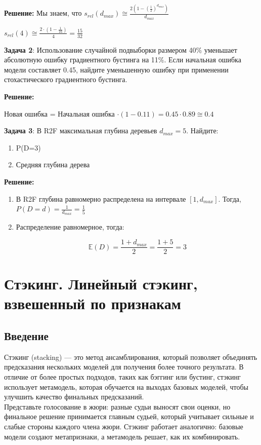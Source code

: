 \textbf{Решение:}
Мы знаем, что $s_{rel}(d_{max})\cong\frac{2 \left(1-\left(\frac{1}{2}\right)^{d_{max}}\right)}{d_{max}}$

$s_{rel}(4) \cong \frac{2 \cdot (1 - \frac{1}{16})}{4} = \frac{15}{32}$

\textbf{Задача 2}:
Использование случайной подвыборки размером 40\% уменьшает абсолютную ошибку градиентного бустинга на 11\%. Если начальная ошибка модели составляет 0.45, найдите уменьшенную ошибку при применении стохастического градиентного бустинга.

\textbf{Решение:}
\begin{center}
    Новая ошибка = Начальная ошибка $\cdot (1 - 0.11) = 0.45 \cdot 0.89 \cong 0.4$
\end{center}

\textbf{Задача 3}:
В R2F максимальная глубина деревьев $d_{max} = 5$. Найдите:
\begin{enumerate}
    \item P(D=3)
    \item Средняя глубина дерева
\end{enumerate}

\textbf{Решение:}
\begin{enumerate}
    \item
          В R2F глубина равномерно распределена на интервале $[1, d_{max}]$.
          Тогда, $P(D=d) = \frac{1}{d_{max}} = \frac{1}{5}$

    \item
          Распределение равномерное, тогда:

          $$\mathbb{E}(D) = \frac{1 + d_{max}}{2} = \frac{1 + 5}{2} = 3$$
\end{enumerate}


\section*{Стэкинг. Линейный стэкинг, взвешенный по признакам}

\subsection*{Введение}

Стэкинг (stacking) — это метод ансамблирования, который позволяет объединять предсказания нескольких моделей для получения более точного результата. В отличие от более простых подходов, таких как бэггинг или бустинг, стэкинг использует метамодель, которая обучается на выходах базовых моделей, чтобы улучшить качество финальных предсказаний.
\\
Представьте голосование в жюри: разные судьи выносят свои оценки, но финальное решение принимается главным судьей, который учитывает сильные и слабые стороны каждого члена жюри. Стэкинг работает аналогично: базовые модели создают метапризнаки, а метамодель решает, как их комбинировать.

